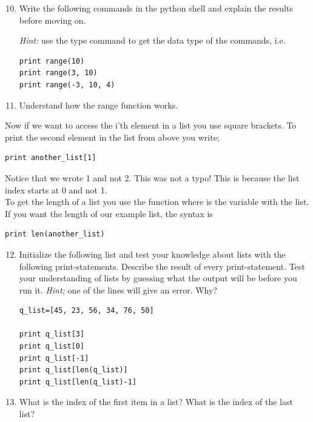 \documentclass{article}
\begin{document}
\begin{enumerate}
  \setcounter{enumi}{9}
  \item Write the following commands in the python shell and explain the results
    before moving on.

    {\em Hint:} use the type command to get the data type of the commands,
    i.e. 

\begin{lstlisting}
print range(10)
print range(3, 10)
print range(-3, 10, 4)
\end{lstlisting}

  \item Understand how the range function works.
\end{enumerate}


Now if we want to access the i'th element in a list
you use square brackets. To print the second element
in the list from above you write;

\begin{lstlisting}
print another_list[1]
\end{lstlisting}

Notice that we wrote 1 and not 2. This was not a typo!
This is because the list index starts at 0 and not 1.\\

To get the length of a list you use the function 
where  is the variable with the list.
If you want the length of our example list, the syntax is

\begin{lstlisting}
print len(another_list)
\end{lstlisting}


\begin{enumerate}
  \setcounter{enumi}{11}
  \item Initialize the following list and test your knowledge about
    lists with the following print-statements.
    Describe the result of every print-statement. Test your
    understanding of lists by guessing what the output will be before
    you run it. 
    {\em Hint;} one of the lines will give an error. Why?

\begin{lstlisting}
q_list=[45, 23, 56, 34, 76, 50]

print q_list[3]
print q_list[0]
print q_list[-1]
print q_list[len(q_list)]
print q_list[len(q_list)-1]
\end{lstlisting}

  \item What is the index of the first item in a list? What is the index of
    the last list?

\end{enumerate}
\end{document}
